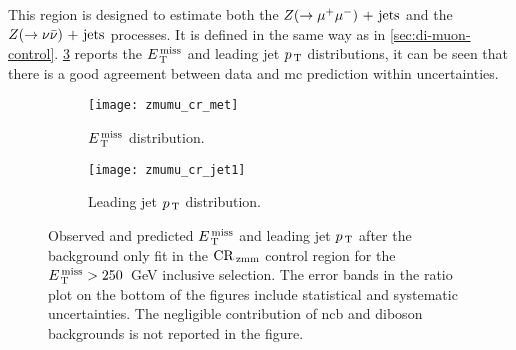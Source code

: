 This region is designed to estimate both the $Z (\rightarrow \mu^+ \mu^-)\mathrm{~+~jets}$ and the
$Z (\rightarrow \nu \bar{\nu})\mathrm{~+~jets}$ processes. It is defined in the same way as in
\cref{sec:di-muon-control}. \cref{fig:dimu_cr_plots} reports the $E_\mathrm{\, T}^\mathrm{\, miss}$ and
leading jet $p_\mathrm{\, T}$ distributions, it can be seen that there is a good agreement
between data and \gls{mc} prediction within uncertainties.
\begin{figure}[!th]
  \centering
  \begin{subfigure}[t]{.48\linewidth}
    \texttt{[image: zmumu\_cr\_met]}
    \caption{$E_\mathrm{\, T}^\mathrm{\, miss}$ distribution.}
    \label{fig:ele_cr_met}
  \end{subfigure}
  \begin{subfigure}[t]{.48\linewidth}
    \texttt{[image: zmumu\_cr\_jet1]}
    \caption{Leading jet $p_\mathrm{\, T}$ distribution.}
    \label{fig:ele_cr_jet1}
  \end{subfigure}
  \caption{Observed and predicted $E_\mathrm{\, T}^\mathrm{\, miss}$ and leading jet $p_\mathrm{\, T}$ after the
    background only fit in the $\mathrm{CR}_\mathrm{\, zmm}$ control region for the $E_\mathrm{\, T}^\mathrm{\, miss} > 250$~GeV
    inclusive selection. The error bands in the ratio plot on the bottom of the
    figures include statistical and systematic uncertainties. The negligible
    contribution of \gls{ncb} and diboson backgrounds is not reported in the
    figure.}
  \label{fig:dimu_cr_plots}
\end{figure}
